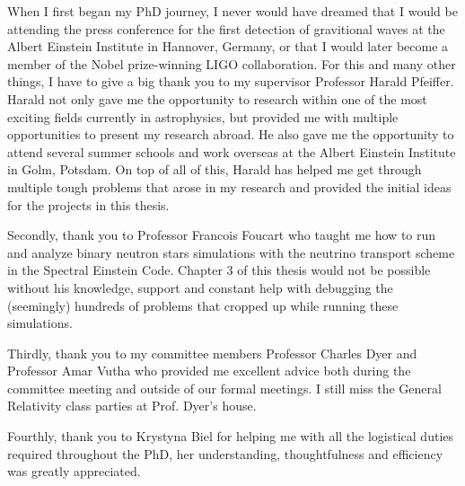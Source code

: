 \begin{preliminary}


\cleardoublepage

\begin{acknowledgements}

When I first began my PhD journey, I never would have dreamed that I would be attending the press conference for the first detection of gravitional waves at the Albert Einstein Institute in Hannover, Germany, or that I would later become a member of the Nobel prize-winning LIGO collaboration. For this and many other things, I have to give a big thank you to my supervisor Professor Harald Pfeiffer. Harald not only gave me the opportunity to research within one of the most exciting fields currently in astrophysics, but provided me with multiple opportunities to present my research abroad. He also gave me the opportunity to attend several summer schools and work overseas at the Albert Einstein Institute in Golm, Potsdam. On top of all of this, Harald has helped me get through multiple tough problems that arose in my research and provided the initial ideas for the projects in this thesis.
 
Secondly, thank you to Professor Francois Foucart who taught me how to run and analyze binary neutron stars simulations with the neutrino transport scheme in the Spectral Einstein Code. Chapter 3 of this thesis would not be possible without his knowledge, support and constant help with debugging the (seemingly) hundreds of problems that cropped up while running these simulations.

Thirdly, thank you to my committee members Professor Charles Dyer and Professor Amar Vutha who provided me excellent advice both during the committee meeting and outside of our formal meetings. I still miss the General Relativity class parties at Prof. Dyer's house.

Fourthly, thank you to Krystyna Biel for helping me with all the logistical duties required throughout the PhD, her understanding, thoughtfulness and efficiency was greatly appreciated. 


\end{acknowledgements}
\end{preliminary}
